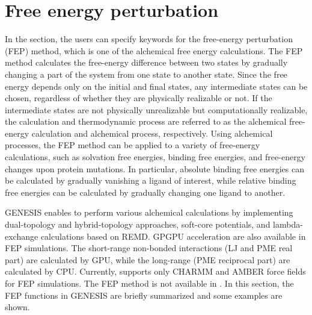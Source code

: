 \documentclass[a4paper,11pt,oneside,english]{sphinxmanual}
\begin{document}
\section{Free energy perturbation}
\label{\detokenize{20_Alchemy:free-energy-perturbation}}
In the \sphinxstylestrong{{[}Alchemy{]}} section, the users can specify keywords for the free-energy perturbation (FEP) method, which is one of the alchemical free energy calculations.
The FEP method calculates the free-energy difference between two states by gradually changing a part of the system from one state to another state.
Since the free energy depends only on the initial and final states, any intermediate states can be chosen, regardless of whether they are physically realizable or not.
If the intermediate states are not physically unrealizable but computationally realizable, the calculation and thermodynamic process are referred to as the alchemical free-energy calculation and alchemical process, respectively.
Using alchemical processes, the FEP method can be applied to a variety of free-energy calculations, such as solvation free energies, binding free energies, and free-energy changes upon protein mutations.
In particular, absolute binding free energies can be calculated by gradually vanishing a ligand of interest, while relative binding free energies can be calculated by gradually changing one ligand to another.

GENESIS enables to perform various alchemical calculations by implementing dual-topology and hybrid-topology approaches, soft-core potentials, and lambda-exchange calculations based on REMD.
GPGPU acceleration are also available in FEP simulations.
The short-range non-bonded interactions (LJ and PME real part) are calculated by GPU, while the long-range (PME reciprocal part) are calculated by CPU.
Currently,  supports only CHARMM and AMBER force fields for FEP simulations.
The FEP method is not available in .
In this section, the FEP functions in GENESIS are briefly summarized and some examples are shown.
\end{document}

